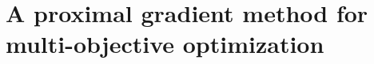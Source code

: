 \documentclass[../main]{subfiles}
\begin{document}
\chapter{A proximal gradient method for multi-objective optimization} \label{sec:pgm}












\end{document}
